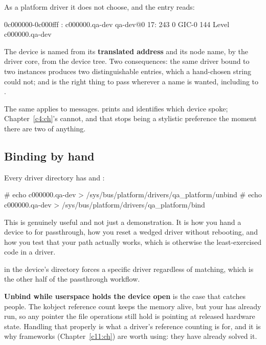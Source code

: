 \noindent As a platform driver it does not choose, and the entry reads:

\begin{console}
0c000000-0c000fff : c000000.qa-dev qa-dev@0
 17:        243          0  GIC-0 144 Level     c000000.qa-dev
\end{console}

\noindent The device is named from its \textbf{translated address} and its node name, by the driver
core, from the device tree. Two consequences: the same driver bound to two instances produces two
distinguishable entries, which a hand-chosen string could not; and  is
the right thing to pass wherever a name is wanted, including to .

The same applies to messages.  prints  and identifies which device spoke; Chapter~\ref{c4:ch}'s
 cannot, and that stops being a stylistic preference the moment there are two of
anything.

\subsection{Binding by hand}
\label{c10:app:a7}

Every driver directory has  and :

\begin{console}
# echo c000000.qa-dev > /sys/bus/platform/drivers/qa_platform/unbind
# echo c000000.qa-dev > /sys/bus/platform/drivers/qa_platform/bind
\end{console}

\noindent This is genuinely useful and not just a demonstration. It is how you hand a device to
 for passthrough, how you reset a wedged driver without rebooting, and how you
test that your  path actually works, which is otherwise the least-exercised code in a
driver.

 in the device's directory forces a specific driver regardless of matching,
which is the other half of the passthrough workflow.

\textbf{Unbind while userspace holds the device open} is the case that catches people. The kobject
reference count keeps the memory alive, but your  has already run, so any pointer the
file operations still hold is pointing at released hardware state. Handling that properly is what a
driver's reference counting is for, and it is why frameworks (Chapter~\ref{c11:ch}) are worth using:
they have already solved it.

